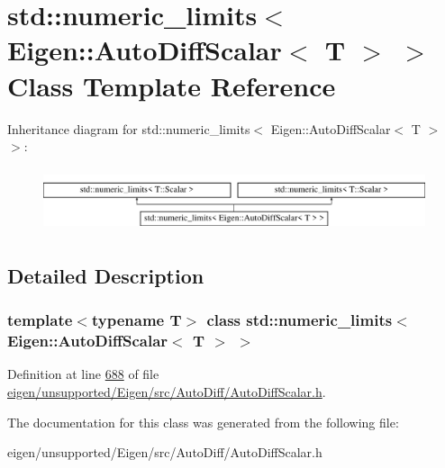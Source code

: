 \hypertarget{classstd_1_1numeric__limits_3_01_eigen_1_1_auto_diff_scalar_3_01_t_01_4_01_4}{}\section{std\+:\+:numeric\+\_\+limits$<$ Eigen\+:\+:Auto\+Diff\+Scalar$<$ T $>$ $>$ Class Template Reference}
\label{classstd_1_1numeric__limits_3_01_eigen_1_1_auto_diff_scalar_3_01_t_01_4_01_4}
Inheritance diagram for std\+:\+:numeric\+\_\+limits$<$ Eigen\+:\+:Auto\+Diff\+Scalar$<$ T $>$ $>$\+:\begin{figure}[H]
\begin{center}
\leavevmode
\includegraphics[height=1.885522cm]{classstd_1_1numeric__limits_3_01_eigen_1_1_auto_diff_scalar_3_01_t_01_4_01_4}
\end{center}
\end{figure}


\subsection{Detailed Description}
\subsubsection*{template$<$typename T$>$\newline
class std\+::numeric\+\_\+limits$<$ Eigen\+::\+Auto\+Diff\+Scalar$<$ T $>$ $>$}



Definition at line \hyperlink{eigen_2unsupported_2_eigen_2src_2_auto_diff_2_auto_diff_scalar_8h_source_l00688}{688} of file \hyperlink{eigen_2unsupported_2_eigen_2src_2_auto_diff_2_auto_diff_scalar_8h_source}{eigen/unsupported/\+Eigen/src/\+Auto\+Diff/\+Auto\+Diff\+Scalar.\+h}.



The documentation for this class was generated from the following file\+:\begin{DoxyCompactItemize}
\item 
eigen/unsupported/\+Eigen/src/\+Auto\+Diff/\+Auto\+Diff\+Scalar.\+h\end{DoxyCompactItemize}

